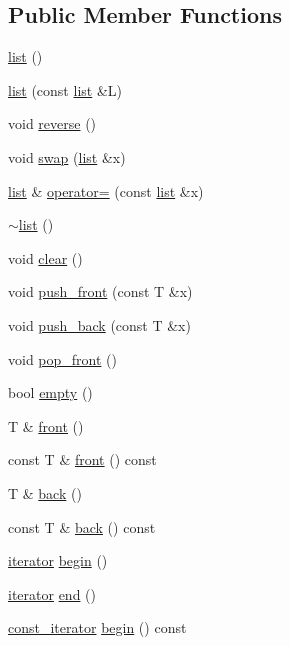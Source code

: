 \subsection*{Public Member Functions}
\begin{DoxyCompactItemize}
\item 
\hyperlink{classlist_afe3efe55d3ee5dd698349834f7eac26b}{list} ()
\item 
\hyperlink{classlist_a856a032c093d96abca1ea4e96e64f05a}{list} (const \hyperlink{classlist}{list} \&L)
\item 
void \hyperlink{classlist_a676f28528dea1df100910363d903ad90}{reverse} ()
\item 
void \hyperlink{classlist_a858ae65ee54f66b557c468be53e20925}{swap} (\hyperlink{classlist}{list} \&x)
\item 
\hyperlink{classlist}{list} \& \hyperlink{classlist_a1d97b78ca649148987703343fab9c9f7}{operator=} (const \hyperlink{classlist}{list} \&x)
\item 
\hyperlink{classlist_adf352cf28624c0811f4f9b160062a88c}{$\sim$list} ()
\item 
void \hyperlink{classlist_a64e8edd9de8e5b2648cc4e993ae48a29}{clear} ()
\item 
void \hyperlink{classlist_ab6ceb52fe79372f40fc1cb559600be89}{push\_\-front} (const T \&x)
\item 
void \hyperlink{classlist_aa199b9d85ae081dfad54fb1c4d973aba}{push\_\-back} (const T \&x)
\item 
void \hyperlink{classlist_ae9c74ac5775defd29b66beb9aa956a14}{pop\_\-front} ()
\item 
bool \hyperlink{classlist_a4aabf08487cbc621c2c45b6f545d6420}{empty} ()
\item 
T \& \hyperlink{classlist_a24aee7b6c85c63311f37ce807bf3598f}{front} ()
\item 
const T \& \hyperlink{classlist_a6ec857bb5edd04e45aec70e0dce83cf1}{front} () const 
\item 
T \& \hyperlink{classlist_a724be25db9c9111f09dde385cabf2e91}{back} ()
\item 
const T \& \hyperlink{classlist_adee5737f4d792778a0f90ae2a286cf7b}{back} () const 
\item 
\hyperlink{classlist_1_1iterator}{iterator} \hyperlink{classlist_a254beaef0a23d76871212c8af2f6118c}{begin} ()
\item 
\hyperlink{classlist_1_1iterator}{iterator} \hyperlink{classlist_a0a0fb2870706f1a5c96500edc5fa8d51}{end} ()
\item 
\hyperlink{classlist_1_1const__iterator}{const\_\-iterator} \hyperlink{classlist_a82d02ae5c829958abc9782d99794c86b}{begin} () const 

\end{DoxyCompactItemize}
